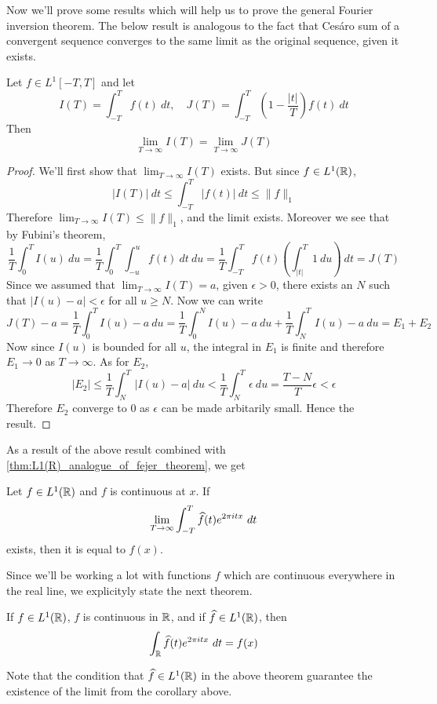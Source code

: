 Now we'll prove some results which will help us to prove the general Fourier inversion theorem. The below result is analogous to the fact that Ces\'aro sum of a convergent sequence converges to the same limit as the original sequence, given it exists.
\begin{proposition}
  \label{prop:cesaro_integral_converge_to_same_limit}
  Let $f \in L^1[-T, T]$ and let $$I(T) = \int_{-T}^T f(t) \ dt, \quad J(T) = \int_{-T}^T\left(1-\frac{|t|}{T}\right)f(t)\ dt$$
  Then $$\lim_{T\to \infty} I(T) = \lim_{T\to \infty}J(T)$$
\end{proposition}
\begin{proof}
  We'll first show that $\lim_{T\to \infty}I(T)$ exists. But since $f\in L^1(\mathbb R)$, $$|I(T)| \ dt \le \int_{-T}^T |f(t)| \ dt \le \|f\|_1$$
  Therefore $\lim_{T \to \infty}I(T) \le \|f\|_1$, and the limit exists. Moreover we see that by Fubini's theorem, $$\frac{1}{T} \int_0^T I(u) \ du = \frac{1}{T} \int_0^T\int_{-u}^u f(t) \ dt \ du = \frac{1}{T}\int_{-T}^T f(t) \left(\int_{|t|}^T 1 \ du \right) \ dt = J(T)$$
  Since we assumed that $\lim_{T\to \infty} I(T) = a$, given $\epsilon > 0$, there exists an $N$ such that $|I(u) - a| < \epsilon$ for all $u \ge N$. Now we can write $$J(T) - a = \frac{1}{T}\int_0^T I(u) - a \ du = \frac{1}{T}\int_0^N I(u) - a \ du + \frac{1}{T}\int_N^T I(u) - a \ du = E_1 + E_2$$
  Now since $I(u)$ is bounded for all $u$, the integral in $E_1$ is finite and therefore $E_1 \to 0$ as $T\to \infty$. As for $E_2$, $$|E_2| \le \frac{1}{T} \int_N^T |I(u) -a| \ du < \frac{1}{T}\int_N^T \epsilon \ du = \frac{T-N}{T}\epsilon < \epsilon$$
  Therefore $E_2$ converge to 0 as $\epsilon$ can be made arbitarily small. Hence the result. %
\end{proof}

As a result of the above result combined with \autoref{thm:L1(R)_analogue_of_fejer_theorem}, we get
\begin{corollary}
  Let $f\in L^1(\mathbb R)$ and $f$ is continuous at $x$. If $$\lim_{T\to \infty} \int_{-T}^T\widehat{f}(t)e^{2\pi itx} \ dt$$
  exists, then it is equal to $f(x)$.
\end{corollary}

Since we'll be working a lot with functions $f$ which are continuous everywhere in the real line, we explicityly state the next theorem.
\begin{theorem}
  If $f\in L^1(\mathbb R)$, $f$ is continuous in $\mathbb R$, and if $\widehat{f} \in L^1(\mathbb R)$, then $$\int_\mathbb R \widehat{f}(t)e^{2\pi itx} \ dt = f(x)$$
\end{theorem}
Note that the condition that $\widehat{f} \in L^1(\mathbb R)$ in the above theorem guarantee the existence of the limit from the corollary above.

